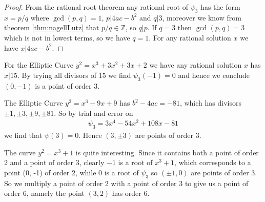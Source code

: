 \begin{proof}
  From the rational root theorem \cite[Section 9.4]{dummiteAndFooteAbstractAlgebra}
  any rational root of $\psi_3$ has the form $x = p/q$ where $\gcd(p, q) = 1$, $p | 4ac - b^2$ and $q|3$,
  moreover we know from theorem \ref{thm:nagellLutz}
  that $p/q \in \mathbb{Z}$, so $q | p$. If $q = 3$ then $\gcd(p, q) = 3$
  which is not in lowest terms, so we have $q = 1$.
  For any rational solution $x$ we have $x|4ac - b^2$.
\end{proof}
\begin{example}
  For the Elliptic Curve
  $y^2 = x^3 + 3x^2 + 3x + 2$ we have
  any rational solution $x$ has
  $x|15$.
  By trying all divisors of $15$ we find $\psi_3(-1) = 0$ and
  hence we conclude $(0,-1)$ is a point of order 3.
\end{example}
\begin{example}
  The Elliptic Curve $y^2 = x^3 -9x + 9$
  has $b^2 - 4ac = -81$, which has divisors
  $\pm 1, \pm 3, \pm 9, \pm 81$.
  So by trial and error on
  \begin{align*}
    \psi_3 = 3x^4 - 54x^2 + 108x - 81
  \end{align*}
  we find that $\psi(3) = 0$.
  Hence $(3, \pm 3)$ are points of order 3.
\end{example}
\begin{example}
  The curve $y^2 = x^3 + 1$ is quite interesting.
  Since it contains both a point of order 2 and a point of order 3,
  clearly $-1$ is a root of $x^3 + 1$, which corresponds to a point (0, -1) of order 2,
  while $0$ is a root of $\psi_3$ so $(\pm 1, 0)$ are points of order 3.
  So we multiply a point of order 2 with a point of order 3 to give us a point of order 6,
  namely the point $(3, 2)$ has order 6.
\end{example}
